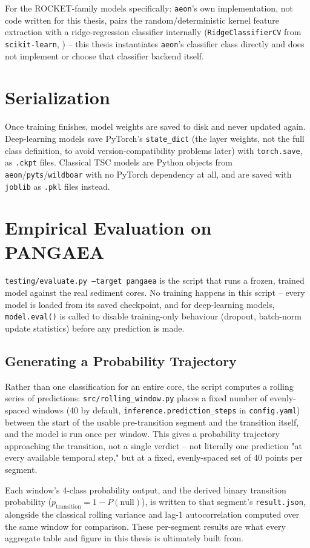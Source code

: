 For the ROCKET-family models specifically: \texttt{aeon}'s own implementation, not code written for this thesis, pairs the random/deterministic kernel feature extraction with a ridge-regression classifier internally (\texttt{RidgeClassifierCV} from \texttt{scikit-learn}, \citealp{pedregosa2011sklearn}) -- this thesis instantiates \texttt{aeon}'s classifier class directly and does not implement or choose that classifier backend itself.

\section{Serialization}

Once training finishes, model weights are saved to disk and never updated again. Deep-learning models save PyTorch's \texttt{state\_dict} (the layer weights, not the full class definition, to avoid version-compatibility problems later) with \texttt{torch.save}, as \texttt{.ckpt} files. Classical TSC models are Python objects from \texttt{aeon}/\texttt{pyts}/\texttt{wildboar} with no PyTorch dependency at all, and are saved with \texttt{joblib} as \texttt{.pkl} files instead.

\section{Empirical Evaluation on PANGAEA}

\texttt{testing/evaluate.py --target pangaea} is the script that runs a frozen, trained model against the real sediment cores. No training happens in this script -- every model is loaded from its saved checkpoint, and for deep-learning models, \texttt{model.eval()} is called to disable training-only behaviour (dropout, batch-norm update statistics) before any prediction is made.

\subsection{Generating a Probability Trajectory}

Rather than one classification for an entire core, the script computes a rolling series of predictions: \texttt{src/rolling\_window.py} places a fixed number of evenly-spaced windows (40 by default, \texttt{inference.prediction\_steps} in \texttt{config.yaml}) between the start of the usable pre-transition segment and the transition itself, and the model is run once per window. This gives a probability trajectory approaching the transition, not a single verdict -- not literally one prediction "at every available temporal step," but at a fixed, evenly-spaced set of 40 points per segment.

Each window's 4-class probability output, and the derived binary transition probability ($p_{\text{transition}} = 1 - P(\text{null})$), is written to that segment's \texttt{result.json}, alongside the classical rolling variance and lag-1 autocorrelation computed over the same window for comparison. These per-segment results are what every aggregate table and figure in this thesis is ultimately built from.
